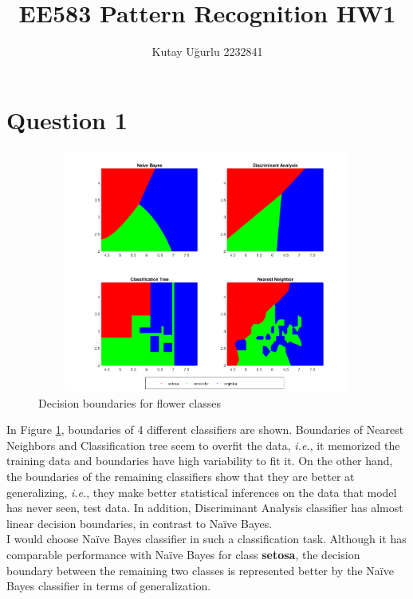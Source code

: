 \documentclass[11pt]{extarticle}
\author{Kutay U\u{g}urlu 2232841}
\begin{document}
   


\fancyfoot[C]{\thepage}
\title{\LARGE \LARGE EE583 Pattern Recognition HW1}

\maketitle{\LARGE}

\pagebreak
\section*{Question 1}

{\centering
    \begin{figure}[h]
        \includegraphics[width=12cm, height=8cm]{q1_output.png}
        \caption{Decision boundaries for flower classes}
        \label{fig:q1figure}
    \end{figure}
}

In Figure \ref{fig:q1figure}, boundaries of 4 different classifiers are shown. Boundaries of Nearest Neighbors and Classification tree
seem to overfit the data, \textit{i.e.}, it memorized the training data and boundaries have high variability to fit it. On the other
hand, the boundaries of the remaining classifiers show that they are better at generalizing, \textit{i.e.}, they make better statistical 
inferences on the data that model has never seen, test data. In addition, Discriminant Analysis classifier has almost linear decision 
boundaries, in contrast to Na\"ive Bayes. \\
I would choose Na\"ive Bayes classifier in such a classification task. Although it has comparable performance with Na\"ive Bayes for class 
\textbf{setosa}, the decision boundary between the remaining two classes is represented better by the Na\"ive Bayes classifier in terms of 
generalization. 
\end{document}
